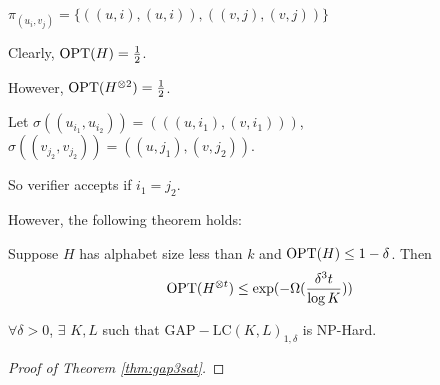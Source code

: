 $ \pi_{(u_i,v_j)}=\{((u,i),(u,i)),((v,j),(v,j))\} $ 

Clearly,  $ \mathrm{OPT}(H)=\frac{1}{2} $.

However,  $ \mathrm{OPT}(H^{\otimes 2})=\frac{1}{2} $.

Let  $ \sigma((u_{i_1},u_{i_2}))=(((u,i_1),(v,i_1))) $,  $ \sigma((v_{j_2},v_{j_2}))=((u,j_1),(v,j_2)) $.  

So verifier accepts if  $ i_1=j_2 $.

However, the following theorem holds:
\begin{theorem}
    Suppose  $ H  $ has alphabet size less than  $ k $ and  $ \mathrm{OPT}(H) \leq 1-\delta $.  Then 
    \[\mathrm{OPT}(H^{\otimes t}) \leq \exp(-\Omega(\frac{\delta^3t}{\log K}))\]  
\end{theorem}
\begin{corollary}
     $ \forall \delta>0 $,  $ \exists  $   $ K,L $ such that  $ \mathrm{GAP-LC}(K,L)_{1,\delta} $ is NP-Hard.  
\end{corollary}

\begin{proof}[Proof of Theorem \ref{thm:gap3sat}]
    
\end{proof}